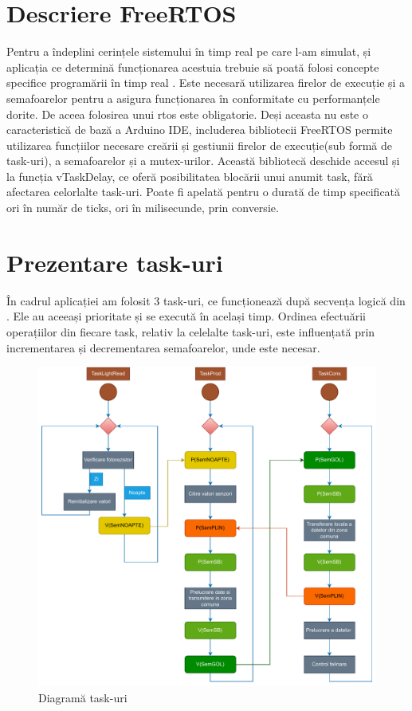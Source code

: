 \section{Descriere FreeRTOS}
Pentru a îndeplini cerințele sistemului în timp real pe care l-am simulat, și aplicația ce determină funcționarea acestuia trebuie să poată folosi concepte specifice programării în timp real \cite{patr}. Este necesară utilizarea firelor de execuție și a semafoarelor pentru a asigura funcționarea în conformitate cu performanțele dorite. De aceea folosirea unui \gls{rtos} este obligatorie. Deși aceasta nu este o caracteristică de bază a Arduino IDE, includerea bibliotecii FreeRTOS permite utilizarea funcțiilor necesare creării și gestiunii firelor de execuție(sub formă de task-uri), a semafoarelor și a mutex-urilor. Această bibliotecă deschide accesul și la funcția vTaskDelay, ce oferă posibilitatea blocării unui anumit task, fără afectarea celorlalte task-uri. Poate fi apelată pentru o durată de timp specificată ori în număr de ticks, ori în milisecunde, prin conversie.

\section{Prezentare task-uri} \label{task}
 În cadrul aplicației am folosit 3 task-uri, ce funcționează după secvența logică din . Ele au aceeași prioritate și se execută în același timp. Ordinea efectuării operațiilor din fiecare task, relativ la celelalte task-uri, este influențată prin incrementarea și decrementarea semafoarelor, unde este necesar.


\begin{figure}[!ht]
    \begin{center}
    \includegraphics[width=0.9\linewidth,keepaspectratio]{pics/diag.drawio.pdf}
    \end{center}
    \caption{Diagramă task-uri}
    \label{fig:diag_task-uri}
\end{figure}

